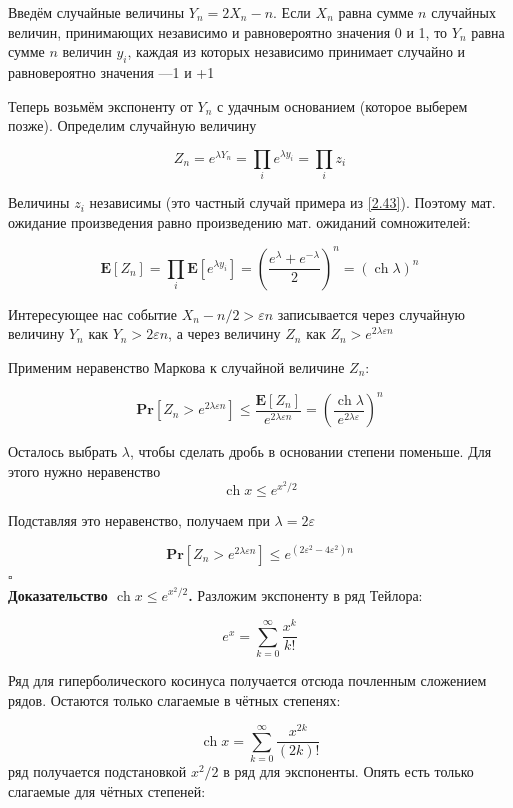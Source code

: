 \documentclass[a4paper]{article}
\newcommand{\qed}{\hfill$\square$}
\begin{document}
Введём случайные величины $Y_{n}=2 X_{n}-n$. Если $X_{n}$ равна сумме $n$ случайных величин, принимающих независимо и равновероятно значения 0 и 1, то $Y_{n}$ равна сумме $n$ величин $y_{i}$, каждая из которых независимо принимает случайно и равновероятно значения —1 и +1

Теперь возьмём экспоненту от $Y_{n}$ с удачным основанием (которое выберем позже). Определим случайную величину

$$
Z_{n}=e^{\lambda Y_{n}}=\prod_{i} e^{\lambda y_{i}}=\prod_{i} z_{i}
$$

Величины $z_{i}$ независимы (это частный случай примера из \ref{2.43}). Поэтому мат. ожидание произведения равно произведению мат. ожиданий сомножителей:

$$
\mathbf{E}\left[Z_{n}\right]=\prod_{i} \mathbf{E}\left[e^{\lambda y_{i}}\right]=\left(\frac{e^{\lambda}+e^{-\lambda}}{2}\right)^{n}=(\operatorname{ch} \lambda)^{n}
$$

Интересующее нас событие $X_{n}-n / 2>\varepsilon n$ записывается через случайную величину $Y_{n}$ как $Y_{n}>2 \varepsilon n$, а через величину $Z_{n}$ как $Z_{n}>e^{2 \lambda \varepsilon n}$

Применим неравенство Маркова к случайной величине $Z_{n}$:

$$
\textbf{Pr}\left[Z_{n}>e^{2 \lambda \varepsilon n}\right] \leqslant \frac{\mathbf{E}\left[Z_{n}\right]}{e^{2 \lambda \varepsilon n}}=\left(\frac{\operatorname{ch} \lambda}{e^{2 \lambda \varepsilon}}\right)^{n}
$$

Осталось выбрать $\lambda$, чтобы сделать дробь в основании степени поменьше. Для этого нужно неравенство
$$
\operatorname{ch} x \leqslant e^{x^{2} / 2}
$$

Подставляя это неравенство, получаем при $\lambda=2 \varepsilon$

$$
\textbf{Pr}\left[Z_{n}>e^{2 \lambda \varepsilon n}\right] \leqslant e^{\left(2 \varepsilon^{2}-4 \varepsilon^{2}\right) n}
$$\qed\\[4mm]
\indent\textbf{Доказательство $\operatorname{ch} x \leqslant e^{x^{2} / 2}$.} Разложим экспоненту в ряд Тейлора:

$$
e^{x}=\sum_{k=0}^{\infty} \frac{x^{k}}{k !}
$$

Ряд для гиперболического косинуса получается отсюда почленным сложением рядов. Остаются только слагаемые в чётных степенях:

$$
\operatorname{ch} x=\sum_{k=0}^{\infty} \frac{x^{2 k}}{(2 k) !}
$$
 ряд получается подстановкой $x^{2} / 2$ в ряд для экспоненты. Опять есть только слагаемые для чётных степеней:
\end{document}
